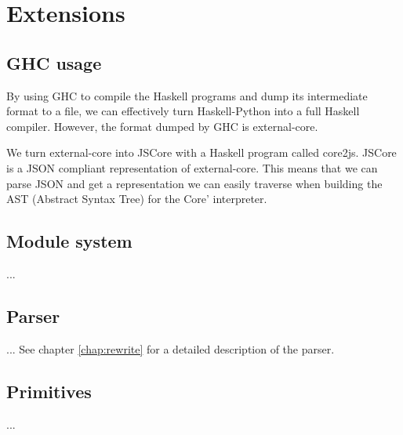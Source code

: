 \section{Extensions}

\subsection{GHC usage}


By using GHC to compile the Haskell programs and dump its intermediate
format to a file, we can effectively turn Haskell-Python into a full
Haskell compiler. However, the format dumped by GHC is external-core.

We turn external-core into JSCore with a Haskell program called core2js.
JSCore is a JSON compliant representation of external-core. This means that
we can parse JSON and get a representation we can easily traverse when building
the AST (Abstract Syntax Tree) for the Core' interpreter.

\subsection{Module system}

...

\subsection{Parser}

...  See chapter \ref{chap:rewrite} for a detailed description of the parser.

\subsection{Primitives}

...

